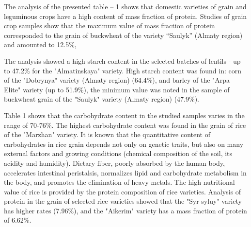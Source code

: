 
The analysis of the presented table -- 1 shows that domestic varieties
of grain and leguminous crops have a high content of mass fraction of
protein. Studies of grain crop samples show that the maximum value of
mass fraction of protein corresponded to the grain of buckwheat of the
variety ``Saulyk'' (Almaty region) and amounted to 12.5\%,

The analysis showed a high starch content in the selected batches of
lentils - up to 47.2\% for the "Almatinskaya" variety. High starch
content was found in: corn of the "Dobrynya" variety (Almaty region)
(64.4\%), and barley of the "Arpa Elite" variety (up to 51.9\%), the
minimum value was noted in the sample of buckwheat grain of the "Saulyk"
variety (Almaty region) (47.9\%).

Table 1 shows that the carbohydrate content in the studied samples
varies in the range of 70-76\%. The highest carbohydrate content was
found in the grain of rice of the "Marzhan" variety. It is known that
the quantitative content of carbohydrates in rice grain depends not only
on genetic traits, but also on many external factors and growing
conditions (chemical composition of the soil, its acidity and humidity).
Dietary fiber, poorly absorbed by the human body, accelerates intestinal
peristalsis, normalizes lipid and carbohydrate metabolism in the body,
and promotes the elimination of heavy metals. The high nutritional value
of rice is provided by the protein composition of rice varieties.
Analysis of protein in the grain of selected rice varieties showed that
the "Syr syluy" variety has higher rates (7.96\%), and the "Aikerim"
variety has a mass fraction of protein of 6.62\%.

